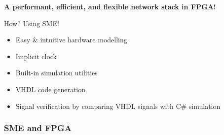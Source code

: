 \documentclass{beamer}
\begin{document}
\begin{frame}
\begin{center}
  \textbf{A performant, efficient, and flexible network stack in FPGA!}
\end{center}

\begin{block}{How?    Using SME!}
  \begin{itemize}
    \item Easy \& intuitive hardware modelling
    \item Implicit clock
    \item Built-in simulation utilities 
    \item VHDL code generation 
    \item Signal verification by comparing VHDL signals with C\# simulation
  \end{itemize}
\end{block}

\end{frame}

\begin{frame}
  \frametitle{SME and FPGA}

\end{frame}
\end{document}
